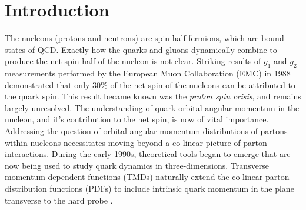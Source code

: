 \chapter{Introduction}

The nucleons (protons and neutrons) are spin-half fermions, which are bound states of QCD.  Exactly how the quarks and gluons dynamically combine to produce the net spin-half of the nucleon is not clear.  Striking results of $g_1$ and $g_2$ measurements performed by the European Muon Collaboration (EMC) in 1988 \cite{pdfs-leader:1988} demonstrated that only $30\%$ of the net spin of the nucleons can be attributed to the quark spin.  This result became known was the \textit{proton spin crisis}, and remains largely unresolved.  The understanding of quark orbital angular momentum in the nucleon, and it's contribution to the net spin, is now of vital importance.  \\

Addressing the question of orbital angular momentum distributions of partons within nucleons necessitates moving beyond a co-linear picture of parton interactions.   During the early 1990s, theoretical tools began to emerge that are now being used to study quark dynamics in three-dimensions.  Transverse momentum dependent functions (TMDs) naturally extend the co-linear parton distribution functions (PDFs) to include intrinsic quark momentum in the plane transverse to the hard probe \cite{tmds-mulders:1995, tmds-bacchetta:2006}.
